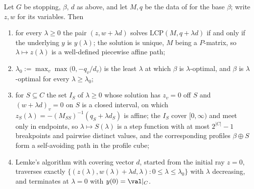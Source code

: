 \begin{theorem}\label{fsa:lemke-homotopy}
Let $G$ be stopping, $\beta$, $d$ as above, and let $M,q$ be the data of
 for the base $\beta$; write $z,w$ for its variables. Then
\begin{enumerate}[label=(\alph*),leftmargin=2.2em]
\item for every $\lambda\ge0$ the pair $(z,w+\lambda d)$ solves
  $\mathrm{LCP}(M,q+\lambda d)$ if and only if the underlying $y$ is
  $y(\lambda)$; the solution is unique, $M$ being a $P$-matrix, so
  $\lambda\mapsto z(\lambda)$ is a well-defined piecewise affine path;
\item $\lambda_0:=\max_v\max\bigl(0,-q_v/d_v\bigr)$ is the least $\lambda$ at
  which $\beta$ is $\lambda$-optimal, and $\beta$ is $\lambda$-optimal for
  every $\lambda\ge\lambda_0$;
\item for $S\subseteq C$ the set $I_S$ of $\lambda\ge0$ whose solution has
  $z_v=0$ off $S$ and $(w+\lambda d)_v=0$ on $S$ is a closed interval, on
  which $z_S(\lambda)=-(M_{SS})^{-1}(q_S+\lambda d_S)$ is affine; the $I_S$
  cover $[0,\infty)$ and meet only in endpoints, so
  $\lambda\mapsto S(\lambda)$ is a step function with at most $2^{|C|}-1$
  breakpoints and pairwise distinct values, and the corresponding profiles
  $\beta\oplus S$ form a self-avoiding path in the profile cube;
\item Lemke's algorithm with covering vector $d$, started from the initial
  ray $z=0$, traverses exactly
  $\{(z(\lambda),w(\lambda)+\lambda d,\lambda):0\le\lambda\le\lambda_0\}$
  with $\lambda$ decreasing, and terminates at $\lambda=0$ with
  $y(0)=\val|_C$.
\end{enumerate}
\end{theorem}

